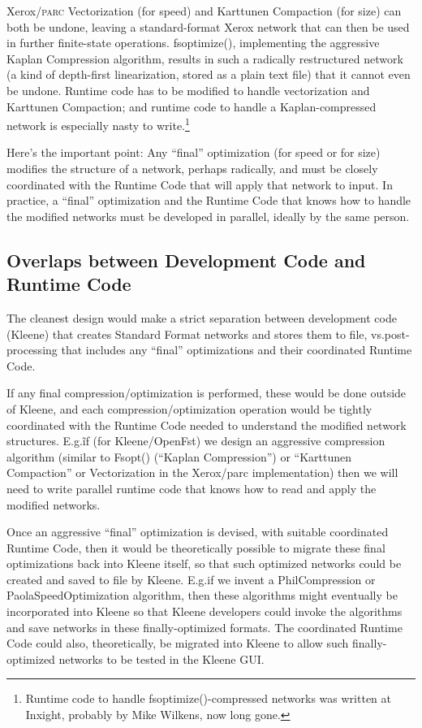 \documentclass[letterpaper,12pt]{article}
\providecommand{\acro}{}\renewcommand{\acro}{\textsc}
\begin{document}
Xerox/\acro{parc} Vectorization (for speed) and Karttunen Compaction (for size) can both be undone, leaving a
standard-format Xerox network that can then be used in further finite-state
operations. fsoptimize(), implementing the
aggressive Kaplan Compression algorithm, results in such a radically restructured network (a kind of depth-first
linearization, stored as a plain text file) that it cannot even be undone.  Runtime code has to be modified to handle vectorization and Karttunen
Compaction; and runtime code to handle a Kaplan-compressed network
is especially nasty to write.\footnote{Runtime code to handle
fsoptimize()-compressed networks was written at Inxight, probably by Mike
Wilkens, now long gone.}

Here's the important point:  Any ``final'' optimization (for speed or for size) modifies the structure
of a network, perhaps radically, and must be closely coordinated with the Runtime Code that will apply
that network to input.  In practice, a ``final'' optimization and the Runtime Code that knows how to
handle the modified networks must be developed in parallel, ideally by the same person.

\subsection{Overlaps between Development Code and Runtime Code}

The cleanest design would make a strict separation between development code (Kleene) that creates
Standard Format networks
and stores them to file, vs.\@ post-processing that includes any ``final'' optimizations and their
coordinated Runtime Code.  

If any final compression/optimization is performed, these would be done outside of
Kleene, and each compression/optimization operation would be tightly coordinated with the
Runtime Code needed to understand the modified network structures.  E.g.\~ if (for Kleene/OpenFst) we design an
aggressive compression algorithm (similar to Fsopt() (``Kaplan Compression'') or ``Karttunen
Compaction'' or Vectorization in the Xerox/parc implementation) then we will need to write parallel runtime code
that knows how to read and apply the modified networks.

Once an aggressive ``final'' optimization is devised, with suitable coordinated Runtime Code, then it would be
theoretically possible to migrate these final optimizations back into Kleene itself, so that such optimized networks could be
created and saved to file by Kleene.  E.g.\@ if we invent a PhilCompression
or PaolaSpeedOptimization algorithm, then these algorithms might
eventually be incorporated into Kleene so that Kleene
developers could invoke the algorithms and save networks in these finally-optimized formats.  The coordinated Runtime Code could
also, theoretically, be migrated into Kleene to allow such finally-optimized networks to be tested in the Kleene GUI.
\end{document}
